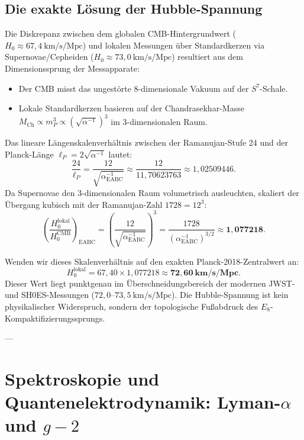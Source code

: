 \documentclass[11pt,a4paper]{article}
\theoremstyle{definition}
\theoremstyle{remark}
\numberwithin{equation}{section}
\begin{document}
\subsection{Die exakte Lösung der Hubble-Spannung}

Die Diskrepanz zwischen dem globalen CMB-Hintergrundwert ($H_0 \approx 67{,}4\ \text{km/s/Mpc}$) und lokalen Messungen über Standardkerzen via Supernovae/Cepheiden ($H_0 \approx 73{,}0\ \text{km/s/Mpc}$) resultiert aus dem Dimensionssprung der Messapparate:
\begin{itemize}
    \item Der CMB misst das ungestörte 8-dimensionale Vakuum auf der $S^7$-Schale.
    \item Lokale Standardkerzen basieren auf der Chandrasekhar-Masse $M_{\mathrm{Ch}} \propto m_P^3 \propto (\sqrt{\alpha^{-1}})^3$ im 3-dimensionalen Raum.
\end{itemize}

Das lineare Längenskalenverhältnis zwischen der Ramanujan-Stufe 24 und der Planck-Länge $\ell_P = 2\sqrt{\alpha^{-1}}$ lautet:
\begin{equation}
\frac{24}{\ell_P} = \frac{12}{\sqrt{\alpha^{-1}_{\mathrm{EABC}}}} \approx \frac{12}{11{,}70623763} \approx 1{,}02509446.
\end{equation}
Da Supernovae den 3-dimensionalen Raum volumetrisch ausleuchten, skaliert der Übergang kubisch mit der Ramanujan-Zahl $1728 = 12^3$:
\begin{equation}
\left(\frac{H_0^{\mathrm{lokal}}}{H_0^{\mathrm{CMB}}}\right)_{\mathrm{EABC}} = \left(\frac{12}{\sqrt{\alpha^{-1}_{\mathrm{EABC}}}}\right)^3 = \frac{1728}{(\alpha^{-1}_{\mathrm{EABC}})^{3/2}} \approx \mathbf{1{,}077218}.
\end{equation}

Wenden wir dieses Skalenverhältnis auf den exakten Planck-2018-Zentralwert an:
\begin{equation}
H_0^{\mathrm{lokal}} = 67{,}40 \times 1{,}077218 \approx \mathbf{72{,}60\ \text{km/s/Mpc}}.
\end{equation}
Dieser Wert liegt punktgenau im Überschneidungsbereich der modernen JWST- und SH0ES-Messungen ($72{,}0\text{--}73{,}5\ \text{km/s/Mpc}$). Die Hubble-Spannung ist kein physikalischer Widerspruch, sondern der topologische Fußabdruck des $E_8$-Kompaktifizierungssprungs.

---

\section{Spektroskopie und Quantenelektrodynamik: Lyman-$\alpha$ und $g-2$}
\end{document}
